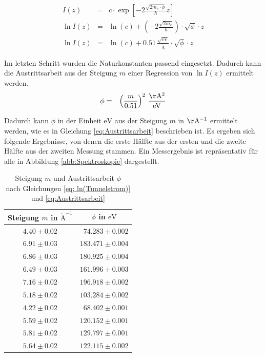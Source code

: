 \documentclass[12pt,a4paper]{scrartcl}
\numberwithin{equation}{section} %
\begin{document}
\begin{eqnarray}
    I(z) &=& c \cdot \exp\left[-2\frac{\sqrt{2m_e\cdot \phi}}{\hbar} z\right] \\
    \ln I(z)
        &=& \ln(c)
            + \left(-2\frac{\sqrt{2m_e}}{\hbar}\right)
            \cdot \sqrt{\phi} \cdot z \\
    \ln I(z) &=& \ln(c) + 0.51 \mathrm{\,\frac{\sqrt{eV}}{\mathrm{\mathring{A}}}}\cdot \sqrt{\phi} \cdot z \label{eq: ln(Tunnelstrom)}
\end{eqnarray}

\noindent
Im letzten Schritt wurden die Naturkonstanten passend eingesetzt.
\cite{Anleitung} Dadurch kann die Austrittsarbeit aus der Steigung $m$ einer
Regression von $\ln I(z)$ ermittelt werden.
\begin{eqnarray}
    \phi &=& \left(\frac{m}{0.51}\right)^2 \mathrm{\,\frac{\AA^2}{eV}} \label{eq:Austrittsarbeit}
\end{eqnarray}

\noindent
Dadurch kann $\phi$ in der Einheit $\mathrm{eV}$ aus der Steigung $m$ in $\mathrm{\AA^{-1}}$ ermittelt werden, wie es in Gleichung \eqref{eq:Austrittsarbeit} beschrieben ist. Es ergeben sich folgende Ergebnisse, von denen die erste Hälfte aus der ersten und die zweite Hälfte aus der zweiten Messung stammen. Ein Messergebnis ist repräsentativ für alle in Abbildung \ref{abb:Spektroskopie} dargestellt.

\begin{table}[h!]
	\centering
	\begin{tabular}{cc}
		Steigung $m$ in $\mathrm{\mathring A}^{-1}$
			& $\phi$ in $\mathrm{eV}$ \\
		\hline
		$4.40 \pm 0.02$ & \ $74.283 \pm 0.002$ \\
		$6.91 \pm 0.03$ & $183.471 \pm 0.004$ \\
		$6.86 \pm 0.03$ & $180.925 \pm 0.004$ \\
		$6.49 \pm 0.03$ & $161.996 \pm 0.003$ \\
		$7.16 \pm 0.02$ & $196.918 \pm 0.002$ \\
		$5.18 \pm 0.02$ & $103.284 \pm 0.002$ \\
		$4.22 \pm 0.02$ & \ $68.402 \pm 0.001$ \\
		$5.59 \pm 0.02$ & $120.152 \pm 0.001$ \\
		$5.81 \pm 0.02$ & $129.797 \pm 0.001$ \\
		$5.64 \pm 0.02$ & $122.115 \pm 0.002$ \\
	\end{tabular}
	\caption{Steigung $m$ und Austrittsarbeit $\phi$\\
		nach Gleichungen \eqref{eq: ln(Tunnelstrom)} und \eqref{eq:Austrittsarbeit}}
	\label{table:Austrittsarbeit}
\end{table}
\end{document}
